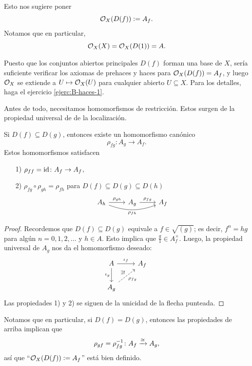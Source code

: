 \documentclass{article}
\numberwithin{equation}{section}
\theoremstyle{definition}
\begin{document}
Esto nos sugiere poner
$$\mathcal{O}_X (D (f)) \mathrel{\mathop:}= A_f.$$
Notamos que en particular,
$$\mathcal{O}_X (X) = \mathcal{O}_X (D(1)) = A.$$

Puesto que los conjuntos abiertos principales $D (f)$ forman una base de $X$,
sería suficiente verificar los axiomas de prehaces y haces para
$\mathcal{O}_X (D (f)) = A_f$, y luego $\mathcal{O}_X$ se extiende a $U \mapsto \mathcal{O}_X (U)$ para
cualquier abierto $U \subseteq X$. Para los detalles, haga el ejercicio
\ref{ejerc:B-haces-1}.

Antes de todo, necesitamos homomorfismos de restricción. Estos surgen
de la propiedad universal de de la localización.

\begin{proposicion}
  Si $D (f) \subseteq D (g)$, entonces existe un homomorfismo canónico
  $$\rho_{fg}\colon A_g \to A_f.$$
  Estos homomorfismos satisfacen
  \begin{enumerate}
  \item[1)] $\rho_{ff} = \mathrm{id}\colon A_f \to A_f$,
  \item[2)] $\rho_{fg}\circ\rho_{gh} = \rho_{fh}$ para
    $D (f) \subseteq D (g) \subseteq D (h)$
    \[ \begin{tikzcd}
        A_h \ar{r}{\rho_{gh}}\ar[bend right=20]{rr}[swap]{\rho_{fh}} & A_g \ar{r}{\rho_{fg}} & A_f
      \end{tikzcd} \]
  \end{enumerate}

  \begin{proof}
    Recordemos que $D (f) \subseteq D (g)$ equivale a $f \in \sqrt{(g)}$;
    es decir, $f^n = hg$ para algún $n = 0,1,2,\ldots$ y $h \in A$. Esto implica
    que $\frac{g}{1} \in A_f^\times$. Luego, la propiedad universal de $A_g$ nos
    da el homomorfismo deseado:
    \[ \begin{tikzcd}
        A \ar{r}{\iota_f}\ar{d}[swap]{\iota_g} & A_f \\
        A_g \ar[dashed]{ur}{\exists!}[swap]{\rho_{fg}}
      \end{tikzcd} \]
    Las propiedades 1) y 2) se siguen de la unicidad de la flecha punteada.
  \end{proof}
\end{proposicion}

Notamos que en particular, si $D (f) = D (g)$, entonces las propiedades de
arriba implican que
$$\rho_{gf} = \rho_{fg}^{-1}\colon A_f \xrightarrow{\cong} A_g,$$
así que ``$\mathcal{O}_X (D (f)) \mathrel{\mathop:}= A_f$'' está bien definido.
\end{document}
